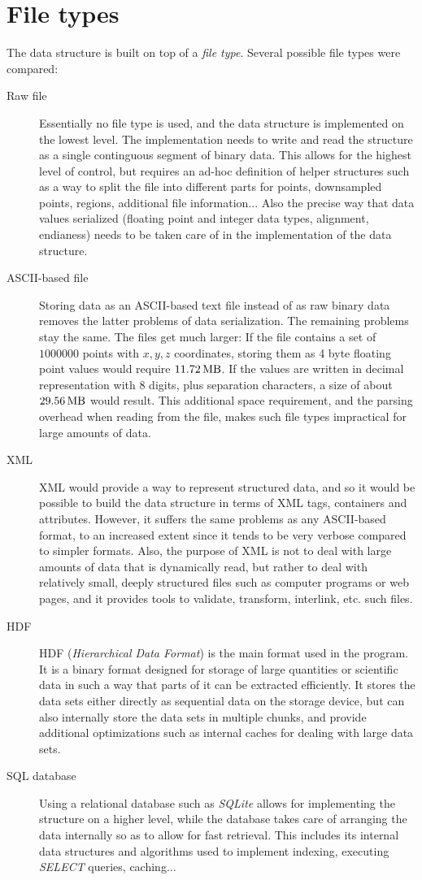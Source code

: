 \documentclass[a4paper,10pt,abstracton,notitlepage]{scrreprt}
\begin{document}
\section{File types}
The data structure is built on top of a \emph{file type}. Several possible file types were compared:
\begin{description}
\item[Raw file] Essentially no file type is used, and the data structure is implemented on the lowest level. The implementation needs to write and read the structure as a single continguous segment of binary data. This allows for the highest level of control, but requires an ad-hoc definition of helper structures such as a way to split the file into different parts for points, downsampled points, regions, additional file information... Also the precise way that data values serialized (floating point and integer data types, alignment, endianess) needs to be taken care of in the implementation of the data structure.
\item[ASCII-based file] Storing data as an ASCII-based text file instead of as raw binary data removes the latter problems of data serialization. The remaining problems stay the same. The files get much larger: If the file contains a set of $1000000$ points with $x, y, z$ coordinates, storing them as 4 byte floating point values would require $\SI{11.72}{\mega\byte}$. If the values are written in decimal representation with 8 digits, plus separation characters, a size of about $\SI{29.56}{\mega\byte}$ would result. This additional space requirement, and the parsing overhead when reading from the file, makes such file types impractical for large amounts of data.
\item[XML] XML would provide a way to represent structured data, and so it would be possible to build the data structure in terms of XML tags, containers and attributes. However, it suffers the same problems as any ASCII-based format, to an increased extent since it tends to be very verbose compared to simpler formats. Also, the purpose of XML is not to deal with large amounts of data that is dynamically read, but rather to deal with relatively small, deeply structured files such as computer programs or web pages, and it provides tools to validate, transform, interlink, etc. such files.
\item[HDF] HDF (\emph{Hierarchical Data Format}) is the main format used in the program. It is a binary format designed for storage of large quantities or scientific data in such a way that parts of it can be extracted efficiently. It stores the data sets either directly as sequential data on the storage device, but can also internally store the data sets in multiple chunks, and provide additional optimizations such as internal caches for dealing with large data sets.
\item[SQL database] Using a relational database such as \emph{SQLite} allows for implementing the structure on a higher level, while the database takes care of arranging the data internally so as to allow for fast retrieval. This includes its internal data structures and algorithms used to implement indexing, executing \emph{SELECT} queries, caching...
\end{description}
\end{document}
